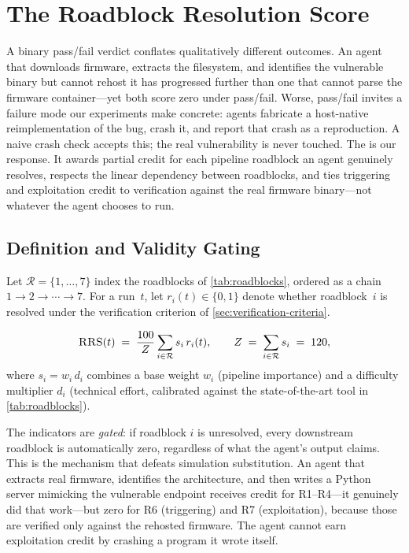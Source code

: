 \section{The Roadblock Resolution Score}
\label{sec:rrs}

A binary pass/fail verdict conflates qualitatively different outcomes. An agent that downloads firmware, extracts the filesystem, and identifies the vulnerable binary but cannot rehost it has progressed further than one that cannot parse the firmware container---yet both score zero under pass/fail. Worse, pass/fail invites a failure mode our experiments make concrete: agents fabricate a host-native reimplementation of the bug, crash it, and report that crash as a reproduction. A naive crash check accepts this; the real vulnerability is never touched. The \rrs is our response. It awards partial credit for each pipeline roadblock an agent genuinely resolves, respects the linear dependency between roadblocks, and ties triggering and exploitation credit to verification against the real firmware binary---not whatever the agent chooses to run.

\subsection{Definition and Validity Gating}

Let $\mathcal{R}=\{1,\dots,7\}$ index the roadblocks of \cref{tab:roadblocks}, ordered as a chain $1\to2\to\cdots\to7$. For a run~$t$, let $r_i(t)\in\{0,1\}$ denote whether roadblock~$i$ is resolved under the verification criterion of \cref{sec:verification-criteria}.

\begin{definition}
\label{def:rrs}
\begin{equation}
    \textsc{RRS}(t) \;=\; \frac{100}{Z}\sum_{i\in\mathcal{R}} s_i \, r_i(t),
    \qquad
    Z \;=\; \sum_{i\in\mathcal{R}} s_i \;=\; 120,
\end{equation}
where $s_i = w_i\, d_i$ combines a base weight $w_i$ (pipeline importance) and a difficulty multiplier $d_i$ (technical effort, calibrated against the state-of-the-art tool in \cref{tab:roadblocks}).
\end{definition}

The indicators are \emph{gated}: if roadblock $i$ is unresolved, every downstream roadblock is automatically zero, regardless of what the agent's output claims. This is the mechanism that defeats simulation substitution. An agent that extracts real firmware, identifies the architecture, and then writes a Python server mimicking the vulnerable endpoint receives credit for R1--R4---it genuinely did that work---but zero for R6 (triggering) and R7 (exploitation), because those are verified only against the rehosted firmware. The agent cannot earn exploitation credit by crashing a program it wrote itself.

